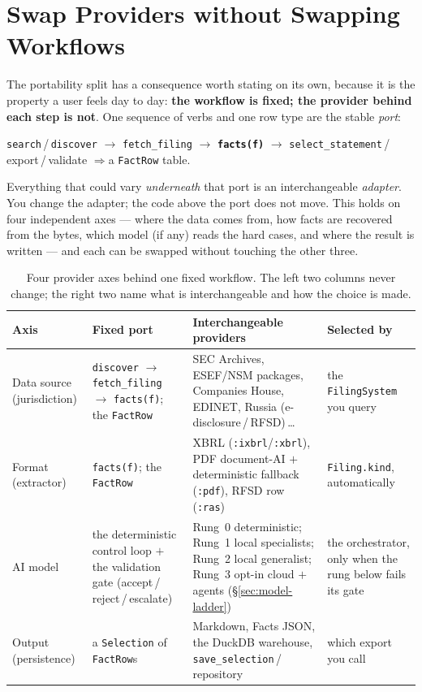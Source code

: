 \documentclass[11pt,a4paper]{report}
\begin{document}
\section{Swap Providers without Swapping Workflows}
\label{sec:swap-providers}

The portability split has a consequence worth stating on its own, because it is the property a user
feels day to day: \textbf{the workflow is fixed; the provider behind each step is not}. One sequence of
verbs and one row type are the stable \emph{port}:

\begin{center}
\texttt{search}\,/\,\texttt{discover} \(\rightarrow\) \texttt{fetch\_filing} \(\rightarrow\)
\textbf{\texttt{facts(f)}} \(\rightarrow\) \texttt{select\_statement}\,/\,export\,/\,validate
\quad\(\Rightarrow\)\quad a \texttt{FactRow} table.
\end{center}

\noindent Everything that could vary \emph{underneath} that port is an interchangeable \emph{adapter}.
You change the adapter; the code above the port does not move. This holds on four independent axes ---
where the data comes from, how facts are recovered from the bytes, which model (if any) reads the hard
cases, and where the result is written --- and each can be swapped without touching the other three.

\begin{table}[htbp]
\centering
\caption{Four provider axes behind one fixed workflow. The left two columns never change; the right two
name what is interchangeable and how the choice is made.}
\label{tab:swap-providers}
\small
\setlength{\tabcolsep}{5pt}
\renewcommand{\arraystretch}{1.25}
\begin{tabular}{@{}p{}p{}p{}p{}@{}}
\toprule
\textbf{Axis} & \textbf{Fixed port} & \textbf{Interchangeable providers} & \textbf{Selected by} \\
\midrule
Data source (jurisdiction) & \texttt{discover} \(\rightarrow\) \texttt{fetch\_filing} \(\rightarrow\)
  \texttt{facts(f)}; the \texttt{FactRow} & SEC Archives, ESEF/NSM packages, Companies House, EDINET,
  Russia (e-disclosure\,/\,RFSD)\,\ldots{} & the \texttt{FilingSystem} you query \\
Format (extractor) & \texttt{facts(f)}; the \texttt{FactRow} & XBRL (\texttt{:ixbrl}/\texttt{:xbrl}),
  PDF document-AI $+$ deterministic fallback (\texttt{:pdf}), RFSD row (\texttt{:ras}) &
  \texttt{Filing.kind}, automatically \\
AI model & the deterministic control loop $+$ the validation gate (accept\,/\,reject\,/\,escalate) &
  Rung~0 deterministic; Rung~1 local specialists; Rung~2 local generalist; Rung~3 opt-in cloud $+$ agents
  (\S\ref{sec:model-ladder}) & the orchestrator, only when the rung below fails its gate \\
Output (persistence) & a \texttt{Selection} of \texttt{FactRow}s & Markdown, Facts JSON, the DuckDB
  warehouse, \texttt{save\_selection}\,/\,repository & which export you call \\
\bottomrule
\end{tabular}
\end{table}
\end{document}
